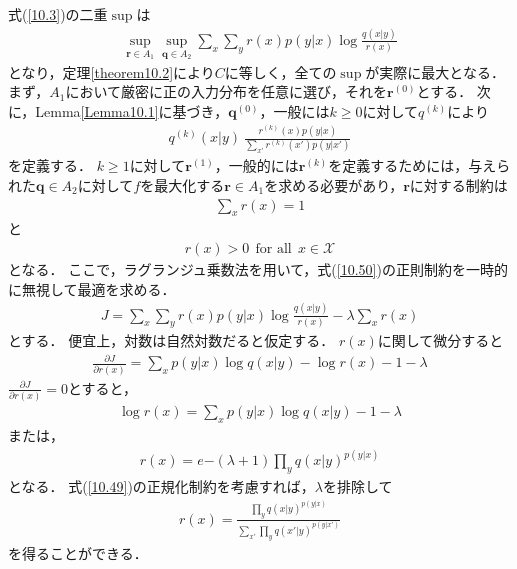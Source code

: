 \documentclass{ltjsarticle}
\theoremstyle{definition}
\begin{document}
式(\ref{10.3})の二重$\sup$は
\begin{eqnarray}
  \label{10.47}
  \sup_{\mathbf{r} \in A_1} \sup_{\mathbf{q} \in A_2} \sum_{x} \sum_{y} r(x) p(y|x) \log \frac{q(x|y)}{r(x)}
\end{eqnarray}
となり，定理\ref{theorem10.2}により$C$に等しく，全ての$\sup$が実際に最大となる．
まず，$A_1$において厳密に正の入力分布を任意に選び，それを$\mathbf{r}^{(0)}$とする．
次に，Lemma\ref{Lemma10.1}に基づき，$\mathbf{q}^{(0)}$，一般には$k \geq 0$に対して$q^{(k)}$により
\begin{eqnarray}
  \label{10.48}
  q^{(k)}(x|y) \ \frac{r^{(k)}(x) p(y|x)}{\sum_{x'} r^{(k)}(x') p(y|x')}
\end{eqnarray}
を定義する．
$k \geq 1$に対して$\mathbf{r}^{(1)}$，一般的には$\mathbf{r}^{(k)}$を定義するためには，与えられた$\mathbf{q} \in A_2$に対して$f$を最大化する$\mathbf{r} \in A_1$を求める必要があり，$\mathbf{r}$に対する制約は
\begin{eqnarray}
  \label{10.49}
  \sum_{x} r(x) = 1
\end{eqnarray}
と
\begin{eqnarray}
  \label{10.50}
  r(x) > 0 \ \ \mbox{for all} \ \ x \in \mathcal{X}
\end{eqnarray}
となる．
ここで，ラグランジュ乗数法を用いて，式(\ref{10.50})の正則制約を一時的に無視して最適を求める．
\begin{eqnarray}
  \label{10.51}
  J = \sum_{x} \sum_{y} r(x) p(y|x) \log \frac{q(x|y)}{r(x)} - \lambda \sum_{x} r(x)
\end{eqnarray}
とする．
便宜上，対数は自然対数だると仮定する．
$r(x)$に関して微分すると
\begin{eqnarray}
  \label{10.52}
  \frac{\partial J }{\partial r(x)} = \sum_{x} p(y|x) \log q(x|y) - \log r(x) - 1 - \lambda 
\end{eqnarray}
$\frac{\partial J }{\partial r(x)} = 0$とすると，
\begin{eqnarray}
  \label{10.53}
  \log r(x) = \sum_{x} p(y|x) \log q(x|y) - 1 - \lambda
\end{eqnarray}
または，
\begin{eqnarray}
  \label{10.54}
  r(x) = e{-(\lambda + 1)} \prod_{y} q(x|y) ^{p(y|x)}
\end{eqnarray}
となる．
式(\ref{10.49})の正規化制約を考慮すれば，$\lambda$を排除して
\begin{eqnarray}
  \label{10.55}
  r(x) = \frac{\prod_{y} q(x|y)^{p(y|x)}}{\sum_{x'} \prod_{y} q(x'|y)^{p(y|x')}}
\end{eqnarray}
を得ることができる．
\end{document}

